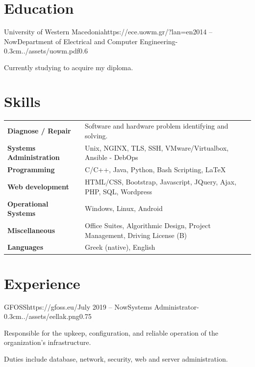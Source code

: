 \documentclass{mycv}
\begin{document}
	\section{Education}
	
	\begin{EntryDatedLogo}{University of Western Macedonia}{https://ece.uowm.gr/?lan=en}{2014 -- Now}{Department of Electrical and Computer Engineering}{-0.3cm}{../assets/uowm.pdf}{0.6}
	\begin{Itemize}
		\item Currently studying to acquire my diploma.
	\end{Itemize}
	\end{EntryDatedLogo}

	\section{Skills}
	\begin{tabular}{m{4.5cm} m{13cm}}
		\textbf{Diagnose / Repair}     	& Software and hardware problem identifying and solving. \\
		\textbf{Systems Administration}	& Unix, NGINX, TLS, SSH,  VMware/Virtualbox, Ansible - DebOps \\
		\textbf{Programming} 	 	   	& C/C++, Java, Python, Bash Scripting, \LaTeX \\
		\textbf{Web development}	   	& HTML/CSS, Bootstrap, Javascript, JQuery, Ajax, PHP, SQL, Wordpress \\
		\textbf{Operational Systems}   	& Windows, Linux, Android \\
		\textbf{Miscellaneous}         	& Office Suites, Algorithmic Design, Project Management, Driving License (B) \\
		\textbf{Languages} 			   	& Greek (native), English 
	\end{tabular}

	\section{Experience}
	
	\begin{EntryDatedLogo}{GFOSS}{https://gfoss.eu/}{July 2019 -- Now}{Systems Administrator}{-0.3cm}{../assets/eellak.png}{0.75}
		\begin{Itemize}
			\item Responsible for the upkeep, configuration, and reliable operation of the organization's infrastructure. \item Duties include database, network, security, web and server administration.
		\end{Itemize}
	\end{EntryDatedLogo}
\end{document}
